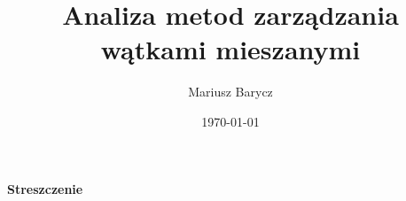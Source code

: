 \documentclass{mwart}
\author{Mariusz Barycz}
\title{Analiza metod zarządzania wątkami mieszanymi}
\date{\today}
\begin{document}
 

\maketitle
\thispagestyle{empty}

\newpage
\tableofcontents
\thispagestyle{empty}

\newpage
\setlength{\parindent}{0pt}
\setlength{\parskip}{1ex plus 0.7ex minus 0.1ex}

\begin{center}

\begin{minipage}{10cm}

\setlength{\parindent}{0pt}
\setlength{\parskip}{1ex plus 0.7ex minus 0.1ex}

\begin{center}
\bf{Streszczenie}
\end{center}

\end{minipage}
\end{center}

\newpage
%
\end{document}
